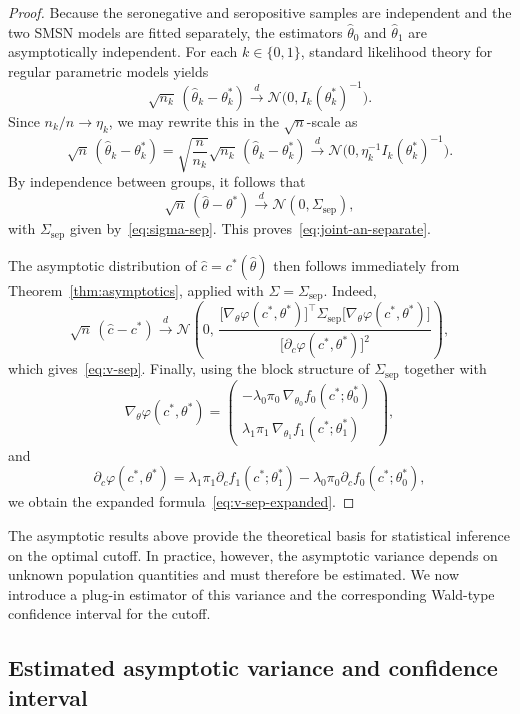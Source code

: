\documentclass[11pt,a4paper]{article}
\theoremstyle{definition}
\theoremstyle{remark}
\newcommand{\1}{\mathbf{1}}
\begin{document}
\begin{proof}
Because the seronegative and seropositive samples are independent and the two SMSN models are fitted separately, the estimators $\hat\theta_0$ and $\hat\theta_1$ are asymptotically independent. For each $k\in\{0,1\}$, standard likelihood theory for regular parametric models yields
\[
\sqrt{n_k}\,(\hat\theta_k-\theta_k^*)
\stackrel{d}{\longrightarrow}
\mathcal N\bigl(0,I_k(\theta_k^*)^{-1}\bigr).
\]
Since $n_k/n\to\eta_k$, we may rewrite this in the $\sqrt n$-scale as
\[
\sqrt n\,(\hat\theta_k-\theta_k^*)
=
\sqrt{\frac{n}{n_k}}
\sqrt{n_k}\,(\hat\theta_k-\theta_k^*)
\stackrel{d}{\longrightarrow}
\mathcal N\bigl(0,\eta_k^{-1}I_k(\theta_k^*)^{-1}\bigr).
\]
By independence between groups, it follows that
\[
\sqrt n\,(\hat\theta-\theta^*)
\stackrel{d}{\longrightarrow}
\mathcal N(0,\Sigma_{\mathrm{sep}}),
\]
with $\Sigma_{\mathrm{sep}}$ given by~\eqref{eq:sigma-sep}. This proves~\eqref{eq:joint-an-separate}.

The asymptotic distribution of $\hat c=c^*(\hat\theta)$ then follows
immediately from Theorem~\ref{thm:asymptotics}, applied with
$\Sigma=\Sigma_{\mathrm{sep}}$. Indeed,
\[
\sqrt n\,(\hat c-c^*)
\stackrel{d}{\longrightarrow}
\mathcal N\!\left(
0,\,
\frac{
\bigl[\nabla_\theta\varphi(c^*,\theta^*)\bigr]^\top
\Sigma_{\mathrm{sep}}
\bigl[\nabla_\theta\varphi(c^*,\theta^*)\bigr]
}{
\bigl[\partial_c\varphi(c^*,\theta^*)\bigr]^2
}
\right),
\]
which gives~\eqref{eq:v-sep}. Finally, using the block structure of $\Sigma_{\mathrm{sep}}$ together with
\[
\nabla_\theta\varphi(c^*,\theta^*)
=
\begin{pmatrix}
-\lambda_0\pi_0\,\nabla_{\theta_0}f_0(c^*;\theta_0^*)\\[0.4em]
\lambda_1\pi_1\,\nabla_{\theta_1}f_1(c^*;\theta_1^*)
\end{pmatrix},
\]
and
\[
\partial_c\varphi(c^*,\theta^*)
=
\lambda_1\pi_1 \partial_c f_1(c^*;\theta_1^*)
-
\lambda_0\pi_0 \partial_c f_0(c^*;\theta_0^*),
\]
we obtain the expanded formula~\eqref{eq:v-sep-expanded}.
\end{proof}

The asymptotic results above provide the theoretical basis for statistical inference on the optimal cutoff. In practice, however, the asymptotic variance depends on unknown population quantities and must therefore be estimated. We now introduce a plug-in estimator of this variance and the corresponding Wald-type confidence interval for the cutoff.

\subsection{Estimated asymptotic variance and confidence interval}
\end{document}
